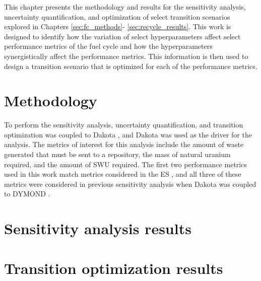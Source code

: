 This chapter presents the methodology and results for the sensitivity 
analysis, uncertainty quantification, and optimization of select 
transition scenarios explored in Chapters \ref{sec:fc_methods}-
\ref{sec:recycle_results}. This work is designed to identify how 
the variation of select hyperparameters affect select performance 
metrics of the fuel cycle and how the hyperparameters synergistically 
affect the performance metrics. This information is then used to design 
a transition scenario that is optimized for each of the performance metrics. 

\section{Methodology}
To perform the sensitivity analysis, uncertainty quantification, and 
transition optimization \Cyclus was coupled to Dakota \cite{adams_dakota_2019},
and Dakota was used as the driver for the analysis. The metrics of 
interest for this analysis include the amount of waste generated that 
must be sent to a repository, the mass of natural uranium required, and 
the amount of \gls{SWU} required. The first two performance 
metrics used in this work match metrics considered in the \gls{ES} 
\cite{wigeland_nuclear_2014}, and all three of these metrics were considered 
in previous sensitivity analysis when Dakota was coupled to \gls{DYMOND}
\cite{feng_sensitivity_2020,richards_application_2021}. 

\section{Sensitivity analysis results}

\section{Transition optimization results}